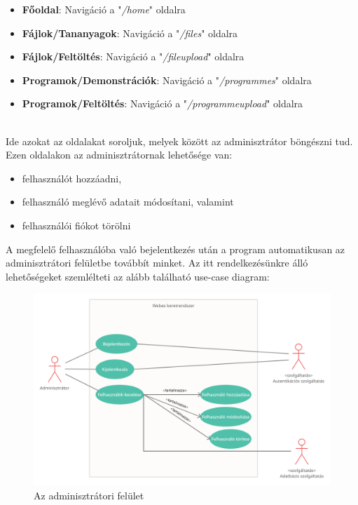 \begin{itemize}
\item{\textbf{Főoldal}: Navigáció a "\textit{/home}" oldalra}
\item{\textbf{Fájlok/Tananyagok}: Navigáció a "\textit{/files}" oldalra}
\item{\textbf{Fájlok/Feltöltés}: Navigáció a "\textit{/fileupload}" oldalra}
\item{\textbf{Programok/Demonstrációk}: Navigáció a "\textit{/programmes}" oldalra}
\item{\textbf{Programok/Feltöltés}: Navigáció a "\textit{/programmeupload}" oldalra}
\end{itemize}

\\

Ide azokat az oldalakat soroljuk, melyek között az adminisztrátor böngészni tud. Ezen oldalakon az adminisztrátornak lehetősége van:

\begin{itemize}
\item{felhasználót hozzáadni,}
\item{felhasználó meglévő adatait módosítani, valamint}
\item{felhasználói fiókot törölni}
\end{itemize}

A megfelelő felhasználóba való bejelentkezés után a program automatikusan az adminisztrátori felületbe továbbít minket. Az itt rendelkezésünkre álló lehetőségeket szemlélteti az alább található use-case diagram:

\begin{figure}[h]
	\centering
		\includegraphics[width=15truecm, height=10truecm]{images/adminisztrator_use_case.png}
	\caption{Az adminisztrátori felület}
	\label{fig:adminusecase}
\end{figure}

